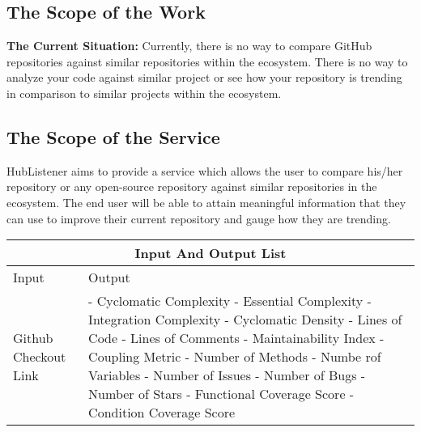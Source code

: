 \documentclass{article}
\begin{document}
\subsection{The Scope of the Work}

\textbf{The Current Situation:} 
Currently, there is no way to compare GitHub repositories against similar repositories within the ecosystem. There is no way to analyze your code against similar project or see how your repository is trending in comparison to similar projects within the ecosystem. 


\subsection{The Scope of the Service}
HubListener aims to provide a service which allows the user to compare his/her repository or any open-source repository against similar repositories in the ecosystem. The end user will be able to attain meaningful information that they can use to improve their current repository and gauge how they are trending. 
\newline

\begin{tabular}{ |p{6cm}||p{6cm}| }
\hline
\multicolumn{2}{|c|}{Input And Output List} \\
\hline
Input & Output \\
\hline 
Github Checkout Link & 
- Cyclomatic Complexity \newline
- Essential Complexity \newline
- Integration Complexity \newline
- Cyclomatic Density\newline
- Lines of Code \newline
- Lines of Comments\newline
- Maintainability Index\newline
- Coupling Metric \newline
- Number of Methods\newline
- Numbe rof Variables\newline 
- Number of Issues\newline
- Number of Bugs\newline
- Number of Stars\newline
- Functional Coverage Score\newline
- Condition Coverage Score \\
\hline
\end{tabular}
\end{document}
